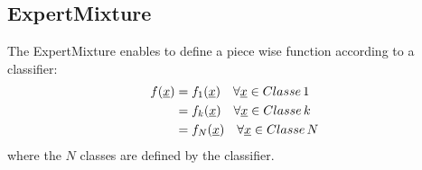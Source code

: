 
\newpage
\subsection{ExpertMixture}

The ExpertMixture enables to define a piece wise function according to a classifier:
\begin{eqnarray}\label{expMixtFct}
f({\underline{x}})  & = f_1({\underline{x}}) \quad \forall {\underline{x}} \in Classe\, 1 \\ \nonumber
& = f_k({\underline{x}}) \quad \forall {\underline{x}} \in Classe\, k  \\\nonumber
& = f_N({\underline{x}}) \quad \forall {\underline{x}} \in Classe\, N
\end{eqnarray}
where the $N$ classes are defined by the  classifier.


